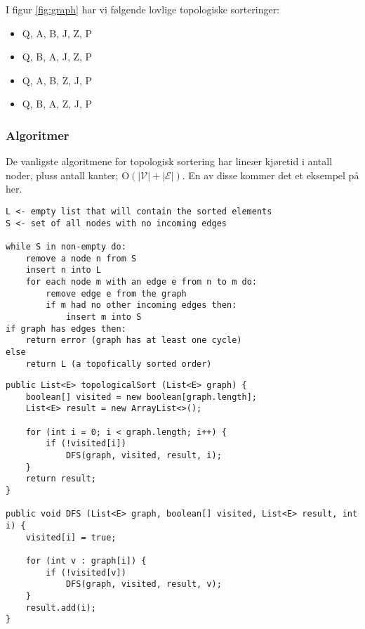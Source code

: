 \documentclass[11pt,a4paper]{article}
\theoremstyle{def}
\begin{document}
I figur \ref{fig:graph} har vi følgende lovlige topologiske sorteringer:

\begin{itemize}
\item
Q, A, B, J, Z, P
\item
Q, B, A, J, Z, P
\item
Q, A, B, Z, J, P
\item
Q, B, A, Z, J, P
\end{itemize}

\subsubsection{Algoritmer} De vanligste algoritmene for topologisk sortering har lineær kjøretid i antall noder, pluss antall kanter; O$(|\mathcal{V}|+|\mathcal{E}|)$. En av disse kommer det et eksempel på her.

\begin{Verbatim}[frame=single]
L <- empty list that will contain the sorted elements
S <- set of all nodes with no incoming edges

while S in non-empty do:
    remove a node n from S
    insert n into L
    for each node m with an edge e from n to m do:
        remove edge e from the graph
        if m had no other incoming edges then:
            insert m into S
if graph has edges then:
    return error (graph has at least one cycle)
else
    return L (a topofically sorted order)
\end{Verbatim}

\begin{lstlisting}[frame=none]
public List<E> topologicalSort (List<E> graph) {
	boolean[] visited = new boolean[graph.length];
	List<E> result = new ArrayList<>();

	for (int i = 0; i < graph.length; i++) {
		if (!visited[i])
			DFS(graph, visited, result, i);
	}
	return result;
}

public void DFS (List<E> graph, boolean[] visited, List<E> result, int i) {
	visited[i] = true;
	
	for (int v : graph[i]) {
		if (!visited[v])
			DFS(graph, visited, result, v);
	}
	result.add(i);
}
\end{lstlisting}
\vspace{-30pt}
\end{document}
